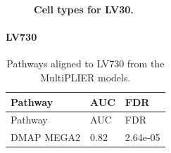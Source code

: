 \documentclass[
  a4paper,
]{article}
\newenvironment{fignos:tagged-figure}[1][]{
  \let\oldfigurename\figurename
  \renewcommand{\figurename}{Supplementary Figure}
}{
  \let\figurename\oldfigurename
}
\newenvironment{tablenos:tagged-table}[1][]{
  \let\oldtablename\tablename
  \renewcommand{\tablename}{Supplementary Table}
}{
  \let\tablename\oldtablename
}
\begin{document}
\begin{fignos:tagged-figure}[S18]

\begin{figure}
\hypertarget{fig:sup:lv30}{%
\centering

\caption{\textbf{Cell types for LV30.}
}\label{fig:sup:lv30}
}
\end{figure}

\end{fignos:tagged-figure}

\clearpage

\hypertarget{lv730}{%
\paragraph{LV730}\label{lv730}}

\begin{tablenos:tagged-table}[S18]

\begin{longtable}[]{@{}lll@{}}
\caption{Pathways aligned to LV730 from the MultiPLIER models.
\label{tbl:sup:multiplier_pathways:lv730}}\label{tbl:sup:multiplier_pathways:lv730}\tabularnewline
\toprule()
Pathway & AUC & FDR \\
\midrule()
\endfirsthead
\toprule()
Pathway & AUC & FDR \\
\midrule()
\endhead
DMAP MEGA2 & 0.82 & 2.64e-05 \\
\bottomrule()
\end{longtable}

\end{tablenos:tagged-table}
\end{document}
